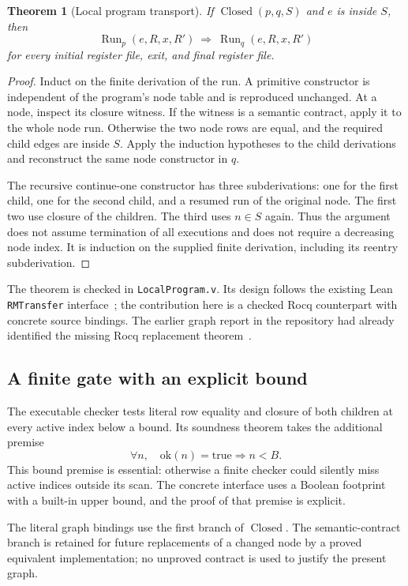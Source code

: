 \documentclass[11pt,letterpaper]{article}
\newtheorem{theorem}{Theorem}[section]
\theoremstyle{definition}\newtheorem{definition}[theorem]{Definition}
\theoremstyle{remark}\newtheorem{remark}[theorem]{Remark}
\newcommand{\Run}{\operatorname{Run}}
\newcommand{\Closed}{\operatorname{Closed}}
\newcommand{\code}[1]{\texttt{\small #1}}
\begin{document}
\begin{theorem}[Local program transport]\label{thm:transport}
If $\Closed(p,q,S)$ and $e$ is inside $S$, then
\[
 \Run_p(e,R,x,R')\ \Longrightarrow\ \Run_q(e,R,x,R')
\]
for every initial register file, exit, and final register file.
\end{theorem}
\begin{proof}
Induct on the finite derivation of the run. A primitive constructor is independent of the program's node table and is reproduced unchanged. At a node, inspect its closure witness. If the witness is a semantic contract, apply it to the whole node run. Otherwise the two node rows are equal, and the required child edges are inside $S$. Apply the induction hypotheses to the child derivations and reconstruct the same node constructor in $q$.

The recursive continue-one constructor has three subderivations: one for the first child, one for the second child, and a resumed run of the original node. The first two use closure of the children. The third uses $n\in S$ again. Thus the argument does not assume termination of all executions and does not require a decreasing node index. It is induction on the supplied finite derivation, including its reentry subderivation.
\end{proof}

The theorem is checked in \code{LocalProgram.v}. Its design follows the existing Lean \code{RMTransfer} interface~\cite{rmtransfer}; the contribution here is a checked Rocq counterpart with concrete source bindings. The earlier graph report in the repository had already identified the missing Rocq replacement theorem~\cite{priorgraph}.

\subsection{A finite gate with an explicit bound}

The executable checker tests literal row equality and closure of both children at every active index below a bound. Its soundness theorem takes the additional premise
\[
  \forall n,\quad \mathrm{ok}(n)=\mathrm{true}\Rightarrow n<B.
\]
This bound premise is essential: otherwise a finite checker could silently miss active indices outside its scan. The concrete interface uses a Boolean footprint with a built-in upper bound, and the proof of that premise is explicit.

The literal graph bindings use the first branch of $\Closed$. The semantic-contract branch is retained for future replacements of a changed node by a proved equivalent implementation; no unproved contract is used to justify the present graph.
\end{document}
